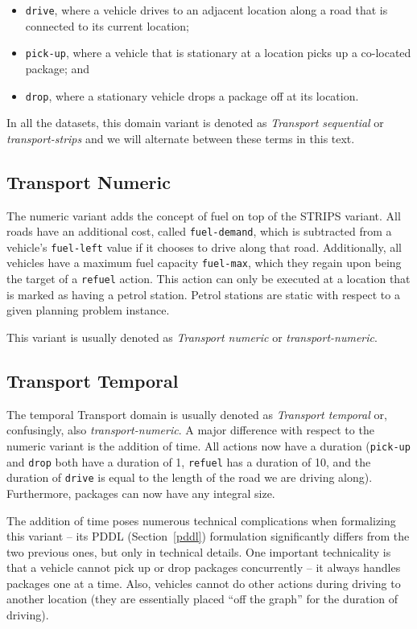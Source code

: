 \begin{itemize}
\item \verb+drive+, where a vehicle drives to an adjacent location
along a road that is connected to its current location;
\item \verb+pick-up+, where a vehicle that is stationary at a location picks up a co-located package; and
\item \verb+drop+, where a stationary vehicle drops a package off at its location.
\end{itemize}

In all the datasets, this domain variant is denoted as \textit{Transport sequential}
or \textit{transport-strips} and we will alternate between these terms in this text.

\subsection{Transport Numeric}\label{transport-numeric}

The numeric variant adds the concept of fuel on top of the STRIPS variant.
All roads have an additional cost, called \verb+fuel-demand+, which is
subtracted from a vehicle's \verb+fuel-left+ value if it chooses to drive along that road.
Additionally, all vehicles have a maximum fuel capacity \verb+fuel-max+,
which they regain upon being the target of a \verb+refuel+ action. This action can only
be executed at a location that is marked as having a petrol station. Petrol stations
are static with respect to a given planning problem instance.

This variant is usually denoted as \textit{Transport numeric} or \textit{transport-numeric}.

\subsection{Transport Temporal}\label{transport-temporal}

The temporal Transport domain is usually denoted as \textit{Transport temporal} or, confusingly,
also \textit{transport-numeric}. A major difference with respect to the numeric variant is
the addition of time. All actions now have a duration (\verb+pick-up+ and \verb+drop+ both have a
duration of 1, \verb+refuel+ has a duration of 10, and the duration of \verb+drive+ is
equal to the length of the road we are driving along). Furthermore, packages can now have any integral size.

The addition of time poses numerous technical complications when formalizing this variant
-- its PDDL (Section~\ref{pddl}) formulation significantly differs from the two previous ones, but only in technical details.
One important technicality is that a vehicle cannot pick up or drop packages concurrently -- it always handles packages one at a time. Also, vehicles cannot do other actions during driving to another location (they are essentially placed ``off the graph'' for the duration of driving).


